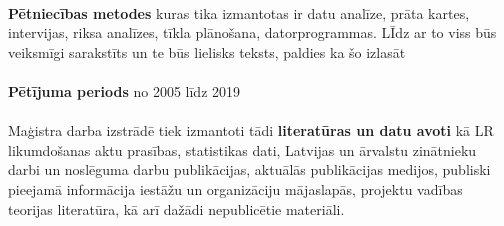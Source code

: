 \paragraph{}
\textbf{Pētniecības metodes} kuras tika izmantotas ir datu analīze,
prāta kartes, intervijas, riksa analīzes, tīkla plānošana, datorprogrammas. LĪdz ar to viss 
būs veiksmīgi sarakstīts un te būs lielisks teksts, paldies ka šo izlasāt
\paragraph{}
\textbf{Pētījuma periods} no 2005 līdz 2019
\paragraph{}
Maģistra darba izstrādē tiek izmantoti tādi \textbf{literatūras un datu avoti} kā LR likumdošanas aktu
prasības, statistikas dati, Latvijas un ārvalstu zinātnieku darbi un noslēguma darbu publikācijas,
aktuālās publikācijas medijos, publiski pieejamā informācija iestāžu un organizāciju mājaslapās,
projektu vadības teorijas literatūra, kā arī dažādi nepublicētie materiāli.